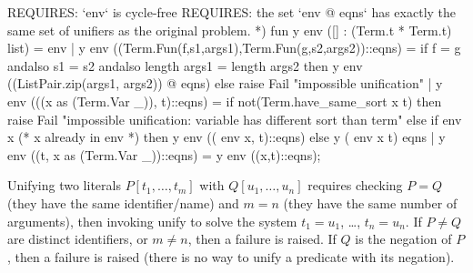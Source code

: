 REQUIRES: `env` is cycle-free
REQUIRES: the set `env @ eqns` has exactly the same set of
          unifiers as the original problem. *)
fun y env ([] : (Term.t * Term.t) list) = env
  | y env ((Term.Fun(f,s1,args1),Term.Fun(g,s2,args2))::eqns) = 
      if f = g andalso s1 = s2 andalso length args1 = length args2
      then y env ((ListPair.zip(args1, args2)) @ eqns)
      else raise Fail "impossible unification"
  | y env (((x as (Term.Var _)), t)::eqns) =
      if not(Term.have_same_sort x t)
      then raise Fail "impossible unification: variable has different sort than term"
      else if  env x (* x already in env *)
      then y env (( env x, t)::eqns)
      else y ( env x t) eqns
  | y env ((t, x as (Term.Var _))::eqns) = y env ((x,t)::eqns);
\eatline
{}\nwendcode{}\nwdocspar
\begin{node}
Unifying two literals $P[t_{1},\dots,t_{m}]$ with $Q[u_{1},\dots,u_{n}]$
requires checking $P=Q$ (they have the same identifier/name) and $m=n$ (they have the same number of arguments), then invoking
{\Tt{}unify\nwendquote} to solve the system $t_{1}=u_{1}$, \dots, $t_{n}=u_{n}$.
If $P\neq Q$ are distinct identifiers, or $m\neq n$, then a failure is raised.
If $Q$ is the negation of $P$, then a failure is raised (there is no
way to unify a predicate with its negation).
\end{node}


